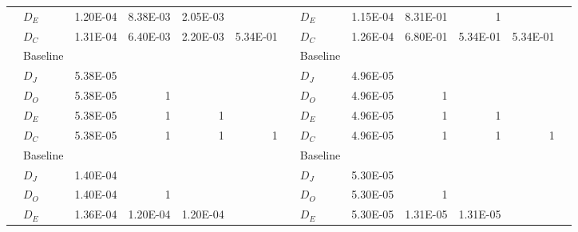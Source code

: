 \begin{table*}
\begin{tabular}{|l|l|lllll|l|lllll|}
           & $D_E$     & 1.20E-04 & 8.38E-03              & 2.05E-03              &          &      & $D_E$     & 1.15E-04 & 8.31E-01              & \multicolumn{1}{r}{1} &                       &       \\
           & $D_C$     & 1.31E-04 & 6.40E-03              & 2.20E-03              & 5.34E-01 &      & $D_C$     & 1.26E-04 & 6.80E-01              & 5.34E-01              & 5.34E-01              &       \\
\hline
\PARAM{}   & Baseline &          &                       &                       &          &      & Baseline &          &                       &                       &                       &       \\
           & $D_J$     & 5.38E-05 &                       &                       &          &      & $D_J$     & 4.96E-05 &                       &                       &                       &       \\
           & $D_O$     & 5.38E-05 & \multicolumn{1}{r}{1} &                       &          &      & $D_O$     & 4.96E-05 & \multicolumn{1}{r}{1} &                       &                       &       \\
           & $D_E$     & 5.38E-05 & \multicolumn{1}{r}{1} & \multicolumn{1}{r}{1} &          &      & $D_E$     & 4.96E-05 & \multicolumn{1}{r}{1} & \multicolumn{1}{r}{1} &                       &       \\
           & $D_C$     & 5.38E-05 & \multicolumn{1}{r}{1} & \multicolumn{1}{r}{1} &    \multicolumn{1}{r}{1}   &      & $D_C$     & 4.96E-05 & \multicolumn{1}{r}{1} & \multicolumn{1}{r}{1} & \multicolumn{1}{r}{1} &       \\
\hline
\MLFS{}{}       & Baseline &          &                       &                       &          &      & Baseline &          &                       &                       &                       &       \\
           & $D_J$     & 1.40E-04 &                       &                       &          &      & $D_J$     & 5.30E-05 &                       &                       &                       &       \\
           & $D_O$     & 1.40E-04 & \multicolumn{1}{r}{1} &                       &          &      & $D_O$     & 5.30E-05 & \multicolumn{1}{r}{1} &                       &                       &       \\
           & $D_E$     & 1.36E-04 & 1.20E-04              & 1.20E-04              &          &      & $D_E$     & 5.30E-05 & 1.31E-05              & 1.31E-05              &                       &       \\

\end{tabular}
\end{table*}
